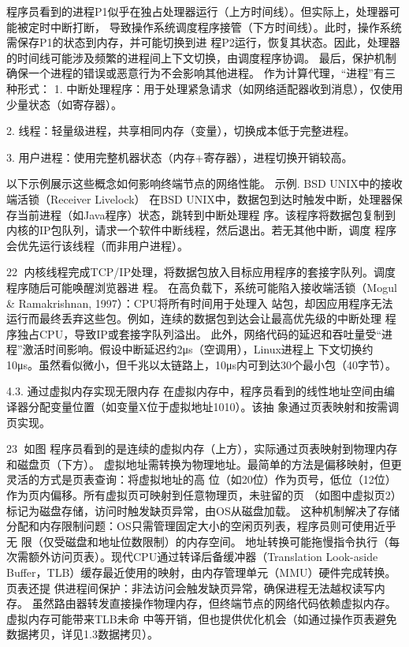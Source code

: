程序员看到的进程P1似乎在独占处理器运行（上方时间线）。但实际上，处理器可能被定时中断打断，
导致操作系统调度程序接管（下方时间线）。此时，操作系统需保存P1的状态到内存，并可能切换到进
程P2运行，恢复其状态。因此，处理器的时间线可能涉及频繁的进程间上下文切换，由调度程序协调。
最后，保护机制确保一个进程的错误或恶意行为不会影响其他进程。
作为计算代理，“进程”有三种形式：
 1. 中断处理程序：用于处理紧急请求（如网络适配器收到消息），仅使用少量状态（如寄存器）。

 2. 线程：轻量级进程，共享相同内存（变量），切换成本低于完整进程。

 3. 用户进程：使用完整机器状态（内存+寄存器），进程切换开销较高。

以下示例展示这些概念如何影响终端节点的网络性能。
示例. BSD UNIX中的接收端活锁（Receiver Livelock）
在BSD UNIX中，数据包到达时触发中断，处理器保存当前进程（如Java程序）状态，跳转到中断处理程
序。该程序将数据包复制到内核的IP包队列，请求一个软件中断线程，然后退出。若无其他中断，调度
程序会优先运行该线程（而非用户进程）。




                                                 22
内核线程完成TCP/IP处理，将数据包放入目标应用程序的套接字队列。调度程序随后可能唤醒浏览器进
程。
在高负载下，系统可能陷入接收端活锁（Mogul & Ramakrishnan, 1997）：CPU将所有时间用于处理入
站包，却因应用程序无法运行而最终丢弃这些包。例如，连续的数据包到达会让最高优先级的中断处理
程序独占CPU，导致IP或套接字队列溢出。
此外，网络代码的延迟和吞吐量受“进程”激活时间影响。假设中断延迟约2μs（空调用），Linux进程上
下文切换约10μs。虽然看似微小，但千兆以太链路上，10μs内可到达30个最小包（40字节）。


4.3.   通过虚拟内存实现无限内存
在虚拟内存中，程序员看到的线性地址空间由编译器分配变量位置（如变量X位于虚拟地址1010）。该抽
象通过页表映射和按需调页实现。




                                                         23
如图 程序员看到的是连续的虚拟内存（上方），实际通过页表映射到物理内存和磁盘页（下方）。
虚拟地址需转换为物理地址。最简单的方法是偏移映射，但更灵活的方式是页表查询：将虚拟地址的高
位（如20位）作为页号，低位（12位）作为页内偏移。所有虚拟页可映射到任意物理页，未驻留的页
（如图中虚拟页2）标记为磁盘存储，访问时触发缺页异常，由OS从磁盘加载。
这种机制解决了存储分配和内存限制问题：OS只需管理固定大小的空闲页列表，程序员则可使用近乎无
限（仅受磁盘和地址位数限制）的内存空间。
地址转换可能拖慢指令执行（每次需额外访问页表）。现代CPU通过转译后备缓冲器（Translation
Look-aside Buffer，TLB）缓存最近使用的映射，由内存管理单元（MMU）硬件完成转换。页表还提
供进程间保护：非法访问会触发缺页异常，确保进程无法越权读写内存。
虽然路由器转发直接操作物理内存，但终端节点的网络代码依赖虚拟内存。虚拟内存可能带来TLB未命
中等开销，但也提供优化机会（如通过操作页表避免数据拷贝，详见1.3数据拷贝）。



